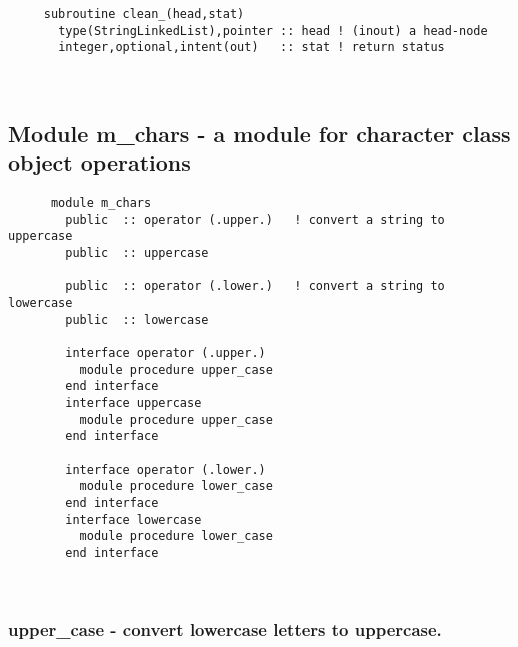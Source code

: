 \begin{verbatim} 
     subroutine clean_(head,stat)
       type(StringLinkedList),pointer :: head ! (inout) a head-node
       integer,optional,intent(out)   :: stat ! return status
 \end{verbatim}%


 
 
\mbox{}\hrulefill\ 
 

  \subsection{Module m\_chars - a module for character class object operations }

\begin{verbatim} 
      module m_chars
        public	:: operator (.upper.)	! convert a string to uppercase
        public	:: uppercase
 
        public	:: operator (.lower.)	! convert a string to lowercase
        public	:: lowercase
 
        interface operator (.upper.)
          module procedure upper_case
        end interface
        interface uppercase
          module procedure upper_case
        end interface
 
        interface operator (.lower.)
          module procedure lower_case
        end interface
        interface lowercase
          module procedure lower_case
        end interface
 \end{verbatim}%
 
 
\mbox{}\hrulefill\ 
 

  \subsubsection{upper\_case - convert lowercase letters to uppercase.}

